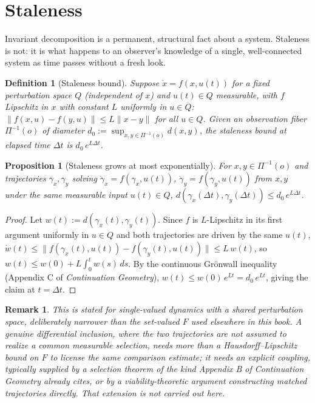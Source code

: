\documentclass[11pt]{report}
\newtheorem{proposition}{Proposition}[chapter]
\newtheorem{definition}{Definition}[chapter]
\newtheorem{remark}{Remark}[chapter]
\begin{document}
\section*{Staleness}

Invariant decomposition is a permanent, structural fact about a system.
Staleness is not: it is what happens to an observer's knowledge of a
single, well-connected system as time passes without a fresh look.

\begin{definition}[Staleness bound]
Suppose $\dot x = f(x, u(t))$ for a fixed perturbation space $Q$
(independent of $x$) and $u(t) \in Q$ measurable, with $f$ Lipschitz
in $x$ with constant $L$ uniformly in $u \in Q$:
$\|f(x,u) - f(y,u)\| \leq L\|x-y\|$ for all $u \in Q$. Given an
observation fiber $\Pi^{-1}(o)$ of diameter $d_0 := \sup_{x,y \in
\Pi^{-1}(o)} d(x,y)$, the staleness bound at elapsed time $\Delta t$
is $d_0\, e^{L \Delta t}$.
\end{definition}

\begin{proposition}[Staleness grows at most exponentially]
\label{prop:staleness}
For $x, y \in \Pi^{-1}(o)$ and trajectories $\gamma_x, \gamma_y$
solving $\dot\gamma_x = f(\gamma_x, u(t))$, $\dot\gamma_y = f(\gamma_y,
u(t))$ from $x, y$ under the same measurable input $u(t) \in Q$,
$d(\gamma_x(\Delta t), \gamma_y(\Delta t)) \leq d_0\, e^{L \Delta t}$.
\end{proposition}
\begin{proof}
Let $w(t) := d(\gamma_x(t), \gamma_y(t))$. Since $f$ is $L$-Lipschitz
in its first argument uniformly in $u \in Q$ and both trajectories
are driven by the same $u(t)$,
$\dot{w}(t) \leq \|f(\gamma_x(t),u(t)) - f(\gamma_y(t),u(t))\| \leq
L\, w(t)$, so $w(t) \leq w(0) + L \int_0^t w(s)\, ds$. By the
continuous Gr\"onwall inequality (Appendix C of \emph{Continuation
Geometry}), $w(t) \leq w(0)\, e^{Lt} = d_0\, e^{Lt}$, giving the claim
at $t = \Delta t$.
\end{proof}

\begin{remark}
This is stated for single-valued dynamics with a shared perturbation
space, deliberately narrower than the set-valued $F$ used elsewhere in
this book. A genuine differential inclusion, where the two
trajectories are not assumed to realize a common measurable selection,
needs more than a Hausdorff--Lipschitz bound on $F$ to license the
same comparison estimate; it needs an explicit coupling, typically
supplied by a selection theorem of the kind Appendix B of
\emph{Continuation Geometry} already cites, or by a viability-theoretic
argument constructing matched trajectories directly. That extension is
not carried out here.
\end{remark}
\end{document}
